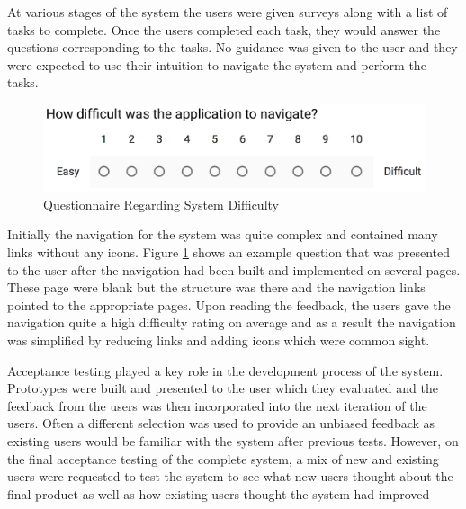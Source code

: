At various stages of the system the users were given surveys along with a list of tasks to complete. Once the users completed each task, they would answer the questions corresponding to the tasks. No guidance was given to the user and they were expected to use their intuition to navigate the system and perform the tasks.

\begin{figure}[H]
	\centering
	\includegraphics[width=1.0\textwidth]{images/Testing/UA_Difficulty}
	\caption{Questionnaire Regarding System Difficulty} \label{fig:UA_Difficulty}
\end{figure}

Initially the navigation for the system was quite complex and contained many links without any icons. Figure \ref{fig:UA_Difficulty} shows an example question that was presented to the user after the navigation had been built and implemented on several pages. These page were blank but the structure was there and the navigation links pointed to the appropriate pages. Upon reading the feedback, the users gave the navigation quite a high difficulty rating on average and as a result the navigation was simplified by reducing links and adding icons which were common sight.

Acceptance testing played a key role in the development process of the system. Prototypes were built and presented to the user which they evaluated and the feedback from the users was then incorporated into the next iteration of the users. Often a different selection was used to provide an unbiased feedback as existing users would be familiar with the system after previous tests. However, on the final acceptance testing of the complete system, a mix of new and existing users were requested to test the system to see what new users thought about the final product as well as how existing users thought the system had improved

\newpage